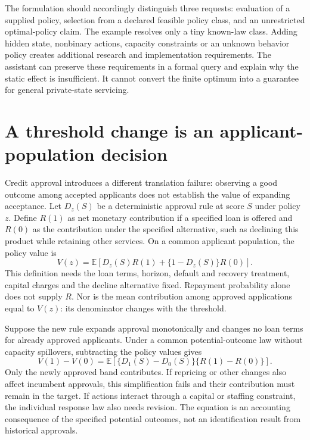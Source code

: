 The formulation should accordingly distinguish three requests: evaluation
of a supplied policy, selection from a declared feasible policy class, and
an unrestricted optimal-policy claim. The example resolves only a tiny
known-law class. Adding hidden state, nonbinary actions, capacity constraints
or an unknown behavior policy creates additional research and implementation
requirements. The assistant can preserve these requirements in a formal
query and explain why the static effect is insufficient. It cannot convert
the finite optimum into a guarantee for general private-state servicing.

\section{A threshold change is an applicant-population decision}
\label{exec17:l2-threshold}

Credit approval introduces a different translation failure: observing a good
outcome among accepted applicants does not establish the value of expanding
acceptance. Let $D_z(S)$ be a deterministic approval rule at score $S$ under
policy $z$. Define $R(1)$ as net monetary contribution if a specified loan
is offered and $R(0)$ as the contribution under the specified alternative,
such as declining this product while retaining other services. On a common
applicant population, the policy value is
\begin{equation}
 V(z)=\mathbb E[D_z(S)R(1)+\{1-D_z(S)\}R(0)].
 \label{exec17:l2-credit-value}
\end{equation}
This definition needs the loan terms, horizon, default and recovery treatment,
capital charges and the decline alternative fixed. Repayment probability
alone does not supply $R$. Nor is the mean contribution among approved
applications equal to $V(z)$: its denominator changes with the threshold.

Suppose the new rule expands approval monotonically and changes no loan
terms for already approved applicants. Under a common potential-outcome law
without capacity spillovers, subtracting the policy values gives
\begin{equation}
 V(1)-V(0)=\mathbb E[\{D_1(S)-D_0(S)\}\{R(1)-R(0)\}].
 \label{exec17:l2-credit-switchers}
\end{equation}
Only the newly approved band contributes. If repricing or other changes also
affect incumbent approvals, this simplification fails and their contribution
must remain in the target. If actions interact through a capital or staffing
constraint, the individual response law also needs revision. The equation
is an accounting consequence of the specified potential outcomes, not an
identification result from historical approvals.


